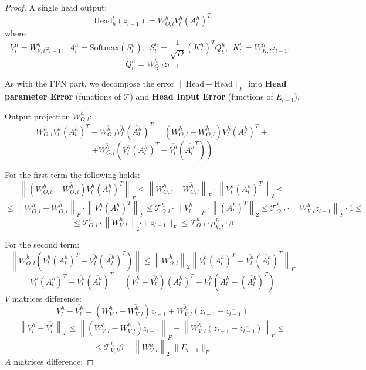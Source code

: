 \documentclass[a4paper,14pt]{extarticle}
\begin{document}
\begin{proof}
        A single head output: 
        $$\text{Head}_h^l(z_{l-1}) = W_{O,l}^h V_l^h (A_l^h)^T$$ 
        where 
        $$V_l^h = W_{V, l}^h z_{l-1}, ~~ A_l^h = \text{Softmax}(S_l^h), ~~S_l^h = \frac{1}{\sqrt{D}} (K_l^h)^T Q_l^h, ~~K_l^h=W_{K,l}^h z_{l-1},~~ $$
        $$Q_l^h=W_{Q,l}^h z_{l-1}$$

        As with the FFN part, we decompose the error $\|\text{Head} - \overline{\text{Head}}\|_F$ into \textbf{Head parameter Error} (functions of $\mathcal{T}$) and \textbf{Head Input Error} (functions of $E_{l-1}$).

        Output projection $W_{O,l}^h$:
        $$ W_{O,l}^h V_l^h (A_l^h)^T - \overline{W_{O,l}^h} \overline{V_l^h} (\overline{A_l^h})^T = \left(W_{O,l}^h - \overline{W_{O,l}^h}\right) V_l^h (A_l^h)^T + $$
        $$+ \overline{W_{O,l}^h} \left(V_l^h (A_l^h)^T - \overline{V_l^h} (\overline{A_l^h}^T)\right) $$

        For the first term the following holds:
        $$\left\|\left(W_{O,l}^h - \overline{W_{O,l}^h}\right) V_l^h (A_l^h)^T \right\|_F \leqslant \left\|W_{O,l}^h - \overline{W_{O,l}^h}\right\|_F\cdot \left\|V_l^h (A_l^h)^T\right\|_2 \leqslant $$
        $$\leqslant \left\|W_{O,l}^h - \overline{W_{O,l}^h}\right\|_F\cdot \left\|V_l^h (A_l^h)^T\right\|_F \leqslant \mathcal{T}_{O,l}^h \cdot \left\|V_l^h\right\|_F \cdot \left\|(A_l^h)^T\right\|_2\leqslant \mathcal{T}_{O,l}^h \cdot \left\|W_{V,l}^h z_{l-1}\right\|_F \cdot 1 \leqslant $$
        $$\leqslant \mathcal{T}_{O,l}^h \cdot \left\|W_{V,l}^h\right\|_2\cdot \|z_{l-1}\|_F \leqslant \mathcal{T}_{O,l}^h \cdot \mu_{V,l}^h\cdot \beta$$
        
        For the second term:
        $$\left\|\overline{W_{O,l}^h} \left(V_l^h (A_l^h)^T - \overline{V_l^h} (\overline{A_l^h})^T\right)\right\| \leqslant \left\|\overline{W_{O,l}^h}\right\|_2 \left\|V_l^h (A_l^h)^T - \overline{V_l^h} (\overline{A_l^h})^T\right\|_F$$
        $$ V_l^h (A_l^h)^T - \overline{V_l^h} (\overline{A_l^h})^T = (V_l^h - \overline{V_l^h}) (A_l^h)^T + \overline{V_l^h} (A_l^h - (\overline{A_l^h})^T) $$
        $V$ matrices difference:
        $$V_l^h - \overline{V_l^h} = (W_{V,l}^h - \overline{W_{V,l}^h})z_{l-1} + \overline{W_{V,l}^h}(z_{l-1} - \overline{z_{l-1}})$$
        $$\left\|V_l^h - \overline{V_l^h}\right\|_F\leqslant \left\|(W_{V,l}^h - \overline{W_{V,l}^h})z_{l-1}\right\|_F + \left\|\overline{W_{V,l}^h}(z_{l-1} - \overline{z_{l-1}})\right\|_F\leqslant $$
        $$\leqslant\mathcal{T}_{V,l}^h \beta + \left\|\overline{W_{V,l}^h}\right\|_2\cdot\|E_{l-1}\|_F$$
        $A$ matrices difference:


\end{proof}
\end{document}
